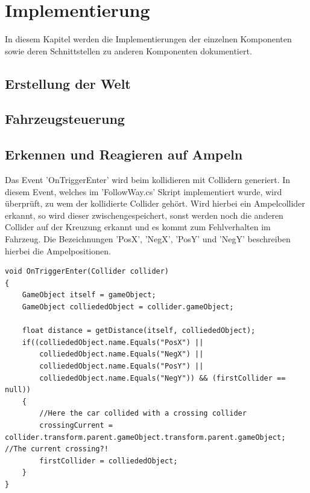 
\chapter{Implementierung}
\label{Implementierung}

In diesem Kapitel werden die Implementierungen der einzelnen Komponenten sowie deren Schnittstellen zu anderen Komponenten dokumentiert.

\thispagestyle{standard}
\pagestyle{standard}

\section{Erstellung der Welt}
\label{Erstellung_der_Welt}

\section{Fahrzeugsteuerung}
\label{Fahrzeugsteuerung}

\section{Erkennen und Reagieren auf Ampeln}
\label{Erkennen_und_Reagieren_auf_Ampeln}

Das Event 'OnTriggerEnter' wird beim kollidieren mit Collidern generiert. In diesem Event, welches im 'FollowWay.cs' Skript implementiert wurde, wird überprüft, zu wem der kollidierte Collider gehört. Wird hierbei ein Ampelcollider erkannt, so wird dieser zwischengespeichert, sonst werden noch die anderen Collider auf der Kreuzung erkannt und es kommt zum Fehlverhalten im Fahrzeug. Die Bezeichnungen 'PosX', 'NegX', 'PosY' und 'NegY' beschreiben hierbei die Ampelpositionen.

\begin{lstlisting}[caption={Erstes erkennen einer Ampel},label={lst:ampel_erkennen}]
void OnTriggerEnter(Collider collider)
{
	GameObject itself = gameObject;
	GameObject colliededObject = collider.gameObject;

	float distance = getDistance(itself, colliededObject);
	if((colliededObject.name.Equals("PosX") ||
		colliededObject.name.Equals("NegX") ||
		colliededObject.name.Equals("PosY") ||
		colliededObject.name.Equals("NegY")) && (firstCollider == null))
	{
		//Here the car collided with a crossing collider
		crossingCurrent = collider.transform.parent.gameObject.transform.parent.gameObject; //The current crossing?!
		firstCollider = colliededObject;
	}
}
\end{lstlisting}

